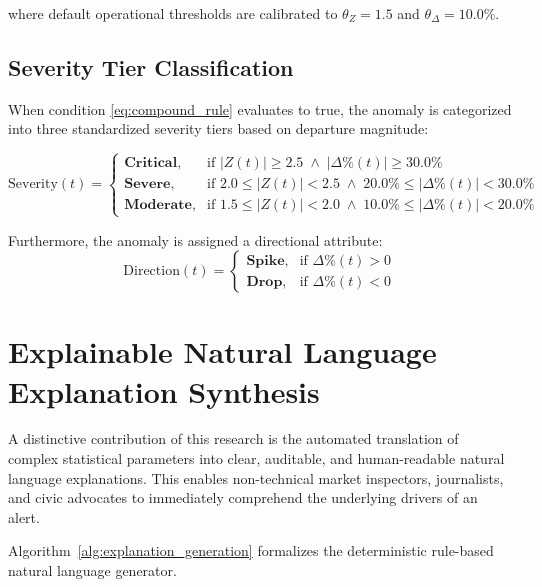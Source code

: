 where default operational thresholds are calibrated to $\theta_Z = 1.5$ and $\theta_{\Delta} = 10.0\%$.

\subsection{Severity Tier Classification}
When condition \eqref{eq:compound_rule} evaluates to true, the anomaly is categorized into three standardized severity tiers based on departure magnitude:

\begin{equation}
\text{Severity}(t) = \begin{cases}
\textbf{Critical}, & \text{if } |Z(t)| \ge 2.5 \;\land\; |\Delta\%(t)| \ge 30.0\% \\
\textbf{Severe}, & \text{if } 2.0 \le |Z(t)| < 2.5 \;\land\; 20.0\% \le |\Delta\%(t)| < 30.0\% \\
\textbf{Moderate}, & \text{if } 1.5 \le |Z(t)| < 2.0 \;\land\; 10.0\% \le |\Delta\%(t)| < 20.0\%
\end{cases}
\end{equation}

Furthermore, the anomaly is assigned a directional attribute:
\begin{equation}
\text{Direction}(t) = \begin{cases}
\textbf{Spike}, & \text{if } \Delta\%(t) > 0 \\
\textbf{Drop}, & \text{if } \Delta\%(t) < 0
\end{cases}
\end{equation}

\section{Explainable Natural Language Explanation Synthesis}
A distinctive contribution of this research is the automated translation of complex statistical parameters into clear, auditable, and human-readable natural language explanations. This enables non-technical market inspectors, journalists, and civic advocates to immediately comprehend the underlying drivers of an alert.

Algorithm~\ref{alg:explanation_generation} formalizes the deterministic rule-based natural language generator.

